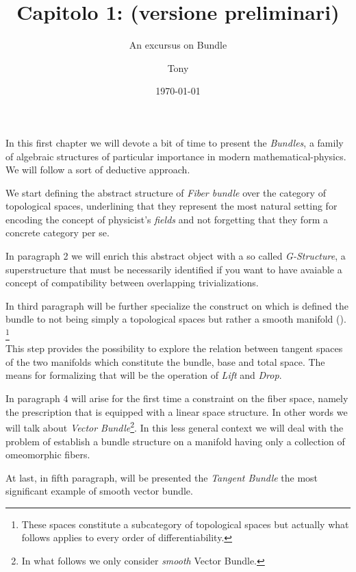 \documentclass[a4paper,12pt]{scrartcl}    %
\begin{document}
	\title{Capitolo 1: (versione preliminari)}
	\subtitle{An excursus on Bundle}
	\author{Tony}
	\date{\today}
\maketitle


\tableofcontents


\newpage



In this first chapter we will devote a bit of time to present the \emph{Bundles}, a family of algebraic structures of particular importance in modern mathematical-physics.
\\
We will follow a sort of deductive approach.

We start defining the abstract structure of \emph{Fiber bundle} over the category of topological spaces, underlining that they represent the most natural setting for encoding the concept of physicist's \emph{fields} and not forgetting that they form a concrete category per se.

In paragraph 2 we will enrich this abstract object with a so called \emph{G-Structure}, a superstructure that must be necessarily identified if you want to have avaiable a concept of compatibility between overlapping trivializations.

In third paragraph will be further specialize the construct on which is defined the bundle to not being simply a topological spaces but rather a smooth manifold (). \footnote{These spaces constitute a subcategory of topological spaces but actually what follows applies to every order of differentiability.}
\\
This step provides the possibility to explore the relation between tangent spaces of the two manifolds which constitute the bundle, base and total space. The means for formalizing that will be the operation of \emph{Lift} and \emph{Drop}.

In paragraph 4 will arise for the first time a constraint on the fiber space, namely the prescription that is equipped with a linear space structure. In other words we will talk about \emph{Vector Bundle}\footnote{In what follows we only consider \emph{smooth} Vector Bundle.}.
In this less general context we will deal with the problem of establish a bundle structure on a manifold having only a collection of omeomorphic fibers.

At last, in fifth paragraph, will be presented the \emph{Tangent Bundle} the most significant example of smooth vector bundle.
\end{document}
